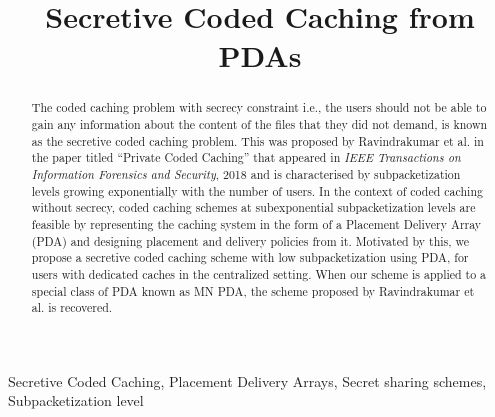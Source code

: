 \documentclass[conference]{IEEEtran}
\begin{document}
\title{Secretive Coded Caching from PDAs\\
}

\author{
\and
{}
}

\maketitle

	\begin{abstract}
		The coded caching problem with secrecy constraint i.e., the users should not be able to gain any information about the content of the files that they did not demand, is known as the secretive coded caching problem. This was proposed by Ravindrakumar et al. in the paper titled ``Private Coded Caching'' that appeared in \emph{ IEEE Transactions on Information Forensics and Security}, 2018 and is characterised by subpacketization levels growing exponentially with the number of users. In the context of coded caching without secrecy, coded caching schemes at subexponential subpacketization levels are feasible by representing the caching system in the form of a Placement Delivery Array (PDA) and designing placement and delivery policies from it. Motivated by this, we propose a secretive coded caching scheme with low subpacketization using PDA, for users with dedicated caches in the centralized setting. When our scheme is applied to a special class of PDA known as MN PDA, the scheme proposed by Ravindrakumar et al. is recovered. 
	\end{abstract}

\begin{IEEEkeywords}
Secretive Coded Caching, Placement Delivery Arrays, Secret sharing schemes, Subpacketization level
\end{IEEEkeywords}
\end{document}
